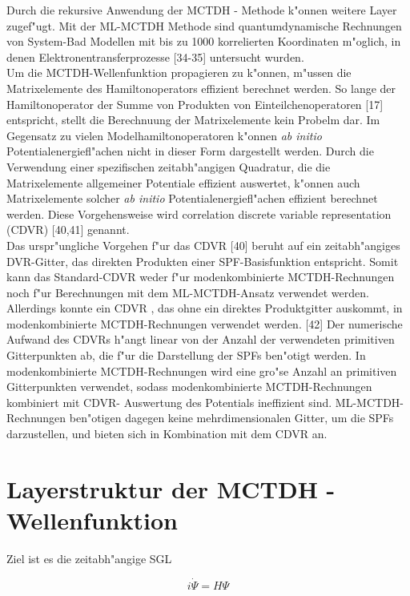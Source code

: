Durch die rekursive Anwendung der MCTDH - Methode k"onnen weitere Layer zugef"ugt.
Mit der ML-MCTDH Methode sind quantumdynamische Rechnungen von System-Bad Modellen mit bis zu 1000 korrelierten Koordinaten m"oglich,
in denen Elektronentransferprozesse \cite{WT3, WST}[34-35] untersucht wurden.
 \\Um die MCTDH-Wellenfunktion propagieren zu k"onnen, m"ussen die Matrixelemente des Hamiltonoperators effizient berechnet werden.
So lange der Hamiltonoperator der Summe von Produkten von Einteilchenoperatoren \cite{MMC1} [17] entspricht, stellt die Berechnuung der Matrixelemente kein Probelm dar.
Im Gegensatz zu vielen Modelhamiltonoperatoren k"onnen \textit{ab initio} Potentialenergiefl"achen nicht in dieser Form dargestellt werden.
Durch die Verwendung einer spezifischen zeitabh"angigen Quadratur, die die Matrixelemente allgemeiner Potentiale effizient auswertet, k"onnen
auch Matrixelemente solcher \textit{ab initio} Potentialenergiefl"achen effizient berechnet werden.
Diese Vorgehensweise wird correlation discrete variable representation (CDVR) \cite{M3, vHM2} [40,41] genannt.
 \\Das urspr"ungliche Vorgehen f"ur das CDVR \cite{M3} [40] beruht auf ein zeitabh"angiges DVR-Gitter, das direkten Produkten einer SPF-Basisfunktion entspricht.
Somit kann das Standard-CDVR weder f"ur modenkombinierte MCTDH-Rechnungen noch f"ur Berechnungen mit dem ML-MCTDH-Ansatz verwendet werden.
 \\Allerdings konnte ein CDVR , das ohne ein direktes Produktgitter auskommt, in modenkombinierte MCTDH-Rechnungen verwendet werden. \cite{vHM3} [42]
 Der numerische Aufwand des CDVRs h"angt linear von der Anzahl der verwendeten primitiven Gitterpunkten ab, die f"ur die Darstellung der SPFs ben"otigt werden.
In modenkombinierte MCTDH-Rechnungen wird eine gro"se Anzahl an primitiven Gitterpunkten verwendet, sodass modenkombinierte MCTDH-Rechnungen kombiniert mit CDVR-
Auswertung des Potentials ineffizient sind. ML-MCTDH-Rechnungen ben"otigen dagegen keine mehrdimensionalen Gitter, um die SPFs darzustellen, und bieten sich
in Kombination mit dem CDVR an.

\section{Layerstruktur der MCTDH - Wellenfunktion}

Ziel ist es die zeitabh"angige SGL

\begin{equation}
i\dot{\Psi} = H \Psi
\label{Eq:SGL}
\end{equation}

